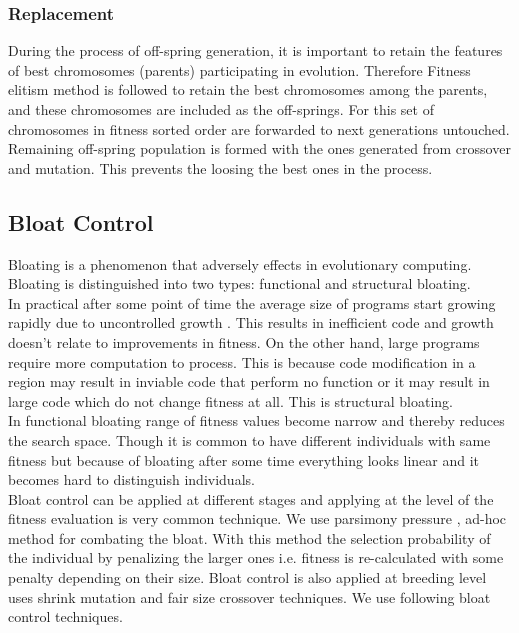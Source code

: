 \documentclass{acm_proc_article-sp}
\begin{document}
\subsubsection{Replacement}
During the process of off-spring generation, it is important to retain the features of best chromosomes (parents) participating in evolution. Therefore Fitness elitism method is followed to retain the best chromosomes among the parents, and these chromosomes are included as the off-springs. For this set of chromosomes in fitness sorted order are forwarded to next generations untouched. Remaining off-spring population is formed with the ones generated from crossover and mutation. This prevents the loosing the best ones in the process.

\subsection{Bloat Control}  \label{bloat}
Bloating \cite{PoliLM2008} is a phenomenon that adversely effects in evolutionary computing. Bloating is distinguished into two types: functional and structural bloating. \\
\indent In practical after some point of time the average size of programs start growing rapidly due to uncontrolled growth \cite{Soule96}. This results in inefficient code and growth doesn't relate to improvements in fitness. On the other hand, large programs require more computation to process. This is because code modification in a region may result in inviable code that perform no function or it may result in large code which do not change fitness at all. This is structural bloating.\\
\indent In functional bloating \cite{LangdonP98} range of fitness values become narrow and thereby reduces the search space. Though it is common to have different individuals with same fitness but because of bloating after some time everything looks linear and it becomes hard to distinguish individuals.\\
\indent Bloat control \cite{Luke06} can be applied at different stages and applying at the level of the fitness evaluation is very common technique. We use parsimony pressure \cite{SouleF98}, ad-hoc method for combating the bloat. With this method the selection probability of the individual by penalizing the larger ones i.e. fitness is re-calculated with some penalty depending on their size. Bloat control is also applied at breeding level uses shrink mutation and fair size crossover \cite{PoliLM2008} techniques. We use following bloat control techniques.
\end{document}
